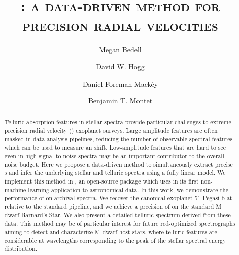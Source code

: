 \documentclass[modern]{aastex62}
\newcommand{\Mdwarf}{Barnard's Star}
\begin{document}
\sloppy\sloppypar\raggedbottom\frenchspacing %

\shorttitle{\wobble}

\graphicspath{ {figures/} }

\title{\textsc{\wobble: a data-driven method for precision radial velocities}}

\author[0000-0001-9907-7742]{Megan Bedell}
\affiliation{\flatiron}

\author[0000-0003-2866-9403]{David W. Hogg}
\affiliation{\flatiron}

\author{Daniel Foreman-Mack\'{e}y}
\affiliation{\flatiron}

\author{Benjamin T. Montet}
\affiliation{\chicago}


\begin{abstract}
Telluric absorption features in stellar spectra provide particular challenges to extreme-precision radial velocity (\EPRV) exoplanet surveys. 
Large amplitude features are often masked in data analysis pipelines, reducing the number of observable spectral features which can be used to measure an \RV shift.
Low-amplitude features that are hard to see even in high signal-to-noise spectra may be an important contributor to the overall \RV noise budget.
Here we propose a data-driven method to simultaneously extract precise \RV s and infer the underlying stellar and telluric spectra using a fully linear model. 
We implement this method in \wobble, an open-source \python package which uses \TF in its first non-machine-learning application to astronomical data. 
In this work, we demonstrate the performance of \wobble on archival \HARPS spectra.
We recover the canonical exoplanet 51 Pegasi b at  relative to the standard \HARPS pipeline, and we achieve a precision of  \cms on the \RV standard M dwarf \Mdwarf. 
We also present a detailed telluric spectrum derived from these data. 
This method may be of particular interest for future red-optimized spectrographs aiming to detect and characterize M dwarf host stars, where telluric features are considerable at wavelengths corresponding to the peak of the stellar spectral energy distribution.  \end{abstract}
\end{document}
